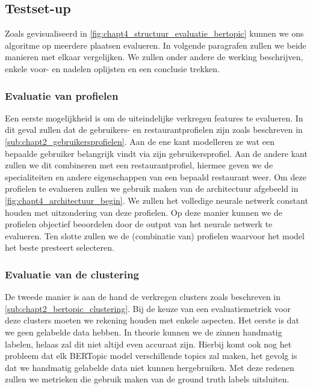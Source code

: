 
\subsection{Testset-up}
\label{sub:chapt4_testsetup}
Zoals gevisualiseerd in \autoref{fig:chapt4_structuur_evaluatie_bertopic} kunnen we ons algoritme op meerdere plaatsen evalueren. In volgende paragrafen zullen we beide manieren met elkaar vergelijken. We zullen onder andere de werking beschrijven, enkele voor- en nadelen oplijsten en een conclusie trekken.

\subsubsection{Evaluatie van profielen}

Een eerste mogelijkheid is om de uiteindelijke verkregen features te evalueren. In dit geval zullen dat de gebruikers- en restaurantprofielen zijn zoals beschreven in \autoref{sub:chapt2_gebruikersprofielen}. Aan de ene kant modelleren ze wat een bepaalde gebruiker belangrijk vindt via zijn gebruikersprofiel. Aan de andere kant zullen we dit combineren met een restaurantprofiel, hiermee geven we de specialiteiten en andere eigenschappen van een bepaald restaurant weer. Om deze profielen te evalueren zullen we gebruik maken van de architectuur afgebeeld in \autoref{fig:chapt4_architectuur_begin}. We zullen het volledige neurale netwerk constant houden met uitzondering van deze profielen. Op deze manier kunnen we de profielen objectief beoordelen door de output van het neurale netwerk te evalueren. Ten slotte zullen we de (combinatie van) profielen waarvoor het model het beste presteert selecteren.

\subsubsection{Evaluatie van de clustering}

De tweede manier is aan de hand de verkregen clusters zoals beschreven in \autoref{sub:chapt2_bertopic_clustering}. Bij de keuze van een evaluatiemetriek voor deze clusters moeten we rekening houden met enkele aspecten. Het eerste is dat we geen gelabelde data hebben. In theorie kunnen we de zinnen handmatig labelen, helaas zal dit niet altijd even accuraat zijn. Hierbij komt ook nog het probleem dat elk BERTopic model verschillende topics zal maken, het gevolg is dat we handmatig gelabelde data niet kunnen hergebruiken. Met deze redenen zullen we metrieken die gebruik maken van de ground truth labels uitsluiten. %

